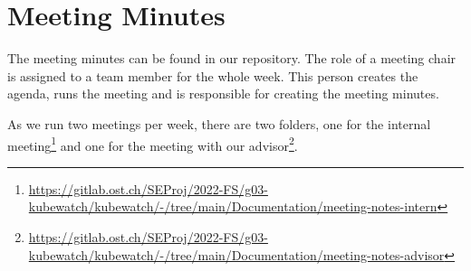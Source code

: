 \chapter{Meeting Minutes}


The meeting minutes can be found in our repository. The role of a meeting chair is assigned to a team member for the whole week. This person creates the agenda, runs the meeting and is responsible for creating the meeting minutes. \newline

As we run two meetings per week, there are two folders, one for the internal meeting\footnote{\url{https://gitlab.ost.ch/SEProj/2022-FS/g03-kubewatch/kubewatch/-/tree/main/Documentation/meeting-notes-intern}}
and one for the meeting with our advisor\footnote{\url{https://gitlab.ost.ch/SEProj/2022-FS/g03-kubewatch/kubewatch/-/tree/main/Documentation/meeting-notes-advisor}}.

